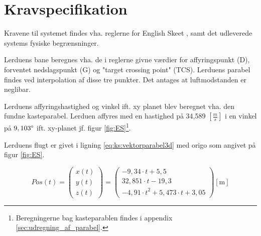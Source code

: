 \section{Kravspecifikation}
\label{sec:kravspecifikation}
Kravene til systemet findes vha. reglerne for English Skeet \citep{ES_regler},
samt det udleverede systems fysiske begrænsninger.

Lerduens bane beregnes vha. de i reglerne givne værdier for affyringspunkt (D), forventet nedslagspunkt (G)
og "target crossing point" (TCS).
Lerduens parabel findes ved interpolation af disse tre punkter. Det antages at luftmodstanden er neglibar.

%
Lerduens affyringshastighed og vinkel ift. xy planet blev beregnet vha. den fundne kasteparabel. 
Lerduen affyres med en hastighed på 34,589 \([\frac{m}{s}]\) i en vinkel på \(9,103 \degree\) 
ift. xy-planet jf. figur \ref{fig:ES}\footnote{Beregningerne bag kasteparablen findes i appendix \ref{sec:udregning_af_parabel}.}. 

Lerduens flugt er givet i ligning \ref{eq:ks:vektorparabel3d} med origo som angivet på figur \ref{fig:ES}. 

\begin{equation}
Pos\left( t \right) = 
\left( \begin{matrix} 
	x\left( t \right)  \\ 
	y\left( t \right)  \\ 
	z\left( t \right)  \end{matrix} \right) =
	 \left( \begin{matrix} 
	- 9,34\cdot t+5,5 \\
  32,851\cdot t-19,3 \\ 
 -{ 4,91\cdot t }^{ 2 }+5,473\cdot t+3,05\end{matrix} \right) [\text{m}]
\label{eq:ks:vektorparabel3d}
\end{equation}

